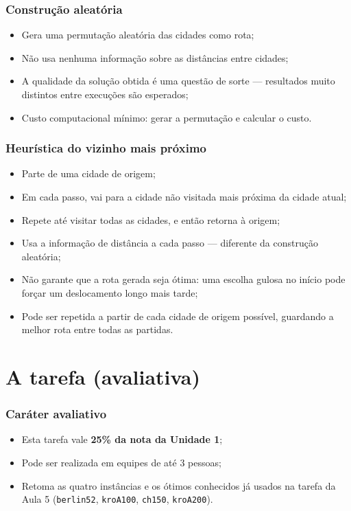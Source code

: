 \documentclass[fleqn]{beamer}
\begin{document}
\begin{frame}
	\frametitle{Construção aleatória}
	\begin{itemize}
		\item Gera uma permutação aleatória das cidades como rota;
		\item Não usa nenhuma informação sobre as distâncias entre
			cidades;
		\item A qualidade da solução obtida é uma questão de sorte —
			resultados muito distintos entre execuções são esperados;
		\item Custo computacional mínimo: gerar a permutação e calcular o
			custo.
	\end{itemize}
\end{frame}

\begin{frame}
	\frametitle{Heurística do vizinho mais próximo}
	\begin{itemize}
		\item Parte de uma cidade de origem;
		\item Em cada passo, vai para a cidade não visitada mais próxima
			da cidade atual;
		\item Repete até visitar todas as cidades, e então retorna à
			origem;
		\item Usa a informação de distância a cada passo — diferente da
			construção aleatória;
		\item Não garante que a rota gerada seja ótima: uma escolha
			gulosa no início pode forçar um deslocamento longo mais tarde;
		\item Pode ser repetida a partir de cada cidade de origem
			possível, guardando a melhor rota entre todas as partidas.
	\end{itemize}
\end{frame}

\section{A tarefa (avaliativa)}

\begin{frame}
	\frametitle{Caráter avaliativo}
	\begin{itemize}
		\item Esta tarefa vale \textbf{25\% da nota da Unidade 1};
		\item Pode ser realizada em equipes de até 3 pessoas;
		\item Retoma as quatro instâncias e os ótimos conhecidos já usados
			na tarefa da Aula 5 (\texttt{berlin52}, \texttt{kroA100},
			\texttt{ch150}, \texttt{kroA200}).
	\end{itemize}
\end{frame}
\end{document}
